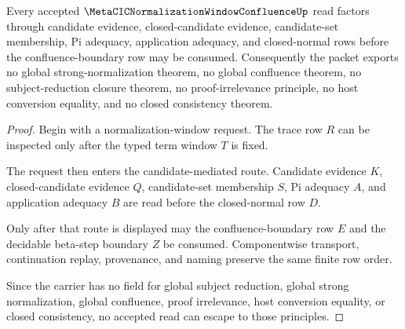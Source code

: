 \begin{theorem}
\label{thm:metacic-normalization-window-confluence-nonescape}
Every accepted $\MetaCICNormalizationWindowConfluenceUp$ read factors through candidate evidence, closed-candidate evidence, candidate-set membership, Pi adequacy, application adequacy, and closed-normal rows before the confluence-boundary row may be consumed. Consequently the packet exports no global strong-normalization theorem, no global confluence theorem, no subject-reduction closure theorem, no proof-irrelevance principle, no host conversion equality, and no closed consistency theorem.
\end{theorem}
\begin{proof}
Begin with a normalization-window request. The trace row $R$ can be inspected only after the typed term window $T$ is fixed.

The request then enters the candidate-mediated route. Candidate evidence $K$, closed-candidate evidence $Q$, candidate-set membership $S$, Pi adequacy $A$, and application adequacy $B$ are read before the closed-normal row $D$.

Only after that route is displayed may the confluence-boundary row $E$ and the decidable beta-step boundary $Z$ be consumed. Componentwise transport, continuation replay, provenance, and naming preserve the same finite row order.

Since the carrier has no field for global subject reduction, global strong normalization, global confluence, proof irrelevance, host conversion equality, or closed consistency, no accepted read can escape to those principles.
\end{proof}



